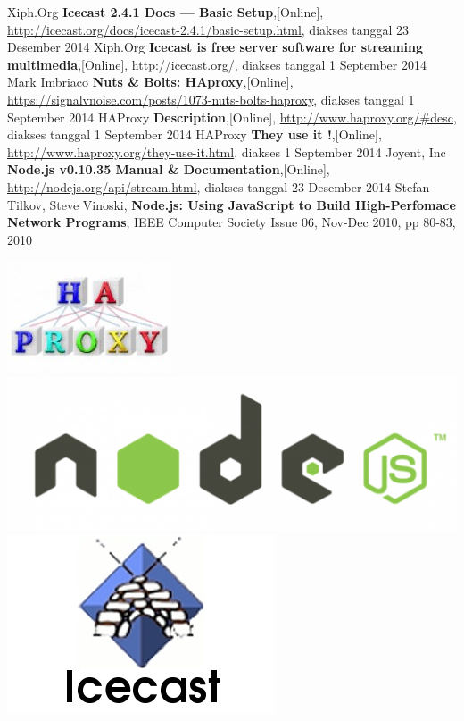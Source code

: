 \documentclass[a0,portrait]{a0poster}
\begin{document}
\begin{multicols}{2}
\begin{tcolorbox}[colback=blue!5!white,colframe=blue!75!black,title=Metode]
\end{tcolorbox}


\begin{tcolorbox}[colback=blue!5!white,colframe=blue!75!black,title=Referensi,fontupper=\normalsize]

	\begin{thebibliography}{9}
		Xiph.Org
		\textbf{Icecast 2.4.1 Docs — Basic Setup},[Online],
		\url{http://icecast.org/docs/icecast-2.4.1/basic-setup.html},
		diakses tanggal 23 Desember 2014
		Xiph.Org
		\textbf{Icecast is free server software for streaming multimedia},[Online],
		\url{http://icecast.org/},
		diakses tanggal 1 September 2014
		Mark Imbriaco
		\textbf{Nuts \& Bolts: HAproxy},[Online],
		\url{https://signalvnoise.com/posts/1073-nuts-bolts-haproxy},
		diakses tanggal 1 September 2014
		HAProxy
		\textbf{Description},[Online],
		\url{http://www.haproxy.org/#desc},
		diakses tanggal 1 September 2014
		HAProxy
		\textbf{They use it !},[Online],
		\url{http://www.haproxy.org/they-use-it.html},
		diakses 1 September 2014
		Joyent, Inc
		\textbf{Node.js v0.10.35 Manual \& Documentation},[Online],
		\url{http://nodejs.org/api/stream.html},
		diakses tanggal 23 Desember 2014
		Stefan Tilkov, Steve Vinoski,
		\textbf{Node.js: Using JavaScript to Build High-Perfomace Network Programs},
		IEEE Computer Society Issue 06, Nov-Dec 2010,
		pp 80-83, 2010
		
	\end{thebibliography}
	
\end{tcolorbox}





\end{multicols}

\LARGE
\begin{tcolorbox}[colback=blue!5!white,colframe=blue!75!black,title=Media]
	
	\includegraphics[width=0.25\linewidth]{logo-haproxy}	\hfill
	\includegraphics[width=0.25\linewidth]{logo-nodejs} \hfill
	\includegraphics[width=0.25\linewidth]{logo-icecast}
	
\end{tcolorbox}
\end{document}
